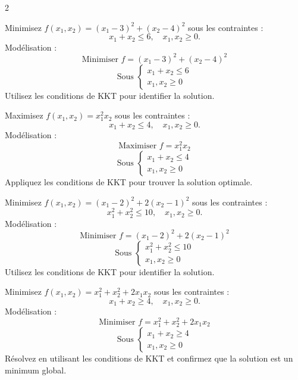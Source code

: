 \begin{multicols}{2}
\begin{exercice}
	Minimisez \( f(x_1, x_2) = (x_1 - 3)^2 + (x_2 - 4)^2 \) sous les contraintes :
	\[
	x_1 + x_2 \leq 6, \quad x_1, x_2 \geq 0.
	\]
	Modélisation :
	\[
	\text{Minimiser } f = (x_1 - 3)^2 + (x_2 - 4)^2
	\]
	\[
	\text{Sous } \begin{cases}
	x_1 + x_2 \leq 6 \\
	x_1, x_2 \geq 0
	\end{cases}
	\]
	Utilisez les conditions de KKT pour identifier la solution.
\end{exercice}

\begin{exercice}
	Maximisez \( f(x_1, x_2) = x_1^2 x_2 \) sous les contraintes :
	\[
	x_1 + x_2 \leq 4, \quad x_1, x_2 \geq 0.
	\]
	Modélisation :
	\[
	\text{Maximiser } f = x_1^2 x_2
	\]
	\[
	\text{Sous } \begin{cases}
	x_1 + x_2 \leq 4 \\
	x_1, x_2 \geq 0
	\end{cases}
	\]
	Appliquez les conditions de KKT pour trouver la solution optimale.
\end{exercice}

\begin{exercice}
	Minimisez \( f(x_1, x_2) = (x_1 - 2)^2 + 2(x_2 - 1)^2 \) sous les contraintes :
	\[
	x_1^2 + x_2^2 \leq 10, \quad x_1, x_2 \geq 0.
	\]
	Modélisation :
	\[
	\text{Minimiser } f = (x_1 - 2)^2 + 2(x_2 - 1)^2
	\]
	\[
	\text{Sous } \begin{cases}
	x_1^2 + x_2^2 \leq 10 \\
	x_1, x_2 \geq 0
	\end{cases}
	\]
	Utilisez les conditions de KKT pour identifier la solution.
\end{exercice}

\begin{exercice}
	Minimisez \( f(x_1, x_2) = x_1^2 + x_2^2 + 2x_1 x_2 \) sous les contraintes :
	\[
	x_1 + x_2 \geq 4, \quad x_1, x_2 \geq 0.
	\]
	Modélisation :
	\[
	\text{Minimiser } f = x_1^2 + x_2^2 + 2x_1 x_2
	\]
	\[
	\text{Sous } \begin{cases}
	x_1 + x_2 \geq 4 \\
	x_1, x_2 \geq 0
	\end{cases}
	\]
	Résolvez en utilisant les conditions de KKT et confirmez que la solution est un minimum global.
\end{exercice}


\end{multicols}
